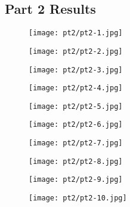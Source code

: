 \subsection{Part 2 Results}
\begin{figure}[H]
	\texttt{[image: pt2/pt2-1.jpg]}
\end{figure}
\begin{figure}[H]
	\texttt{[image: pt2/pt2-2.jpg]}
\end{figure}
\begin{figure}[H]
	\texttt{[image: pt2/pt2-3.jpg]}
\end{figure}
\begin{figure}[H]
	\texttt{[image: pt2/pt2-4.jpg]}
\end{figure}
\begin{figure}[H]
	\texttt{[image: pt2/pt2-5.jpg]}
\end{figure}
\begin{figure}[H]
	\texttt{[image: pt2/pt2-6.jpg]}
\end{figure}
\begin{figure}[H]
	\texttt{[image: pt2/pt2-7.jpg]}
\end{figure}
\begin{figure}[H]
	\texttt{[image: pt2/pt2-8.jpg]}
\end{figure}
\begin{figure}[H]
	\texttt{[image: pt2/pt2-9.jpg]}
\end{figure}
\begin{figure}[H]
	\texttt{[image: pt2/pt2-10.jpg]}
\end{figure} 
